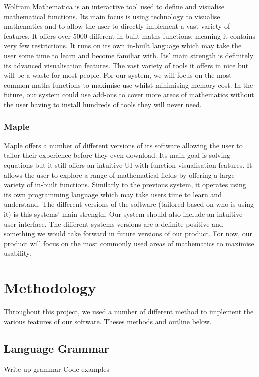\documentclass[a4paper, oneside, 11pt]{report}
\begin{document}
Wolfram Mathematica is an interactive tool used to define and visualise mathematical functions. Its main focus is using technology to visualise mathematics and to allow the user to directly implement a vast variety of features. It offers over 5000 different in-built maths functions, meaning it contains very few restrictions. It runs on its own in-built language which may take the user some time to learn and become familiar with. Its' main strength is definitely its advanced visualisation features.
The vast variety of tools it offers in nice but will be a waste for most people. For our system, we will focus on the most common maths functions to maximise use whilst minimising memory cost. In the future, our system could use add-ons to cover more areas of mathematics without the user having to install hundreds of tools they will never need.


\subsection{Maple\cite{Maple}}

Maple offers a number of different versions of its software allowing the user to tailor their experience before they even download. Its main goal is solving equations but it still offers an intuitive UI with function visualisation features. It allows the user to explore a range of mathematical fields by offering a large variety of in-built functions. Similarly to the previous system, it operates using its own programming language which may take users time to learn and understand. The different versions of the software (tailored based on who is using it) is this systems' main strength.
Our system should also include an intuitive user interface. The different systems versions are a definite positive and something we would take forward in future versions of our product. For now, our product will focus on the most commonly used areas of mathematics to maximise usability.


\chapter{Methodology}

Throughout this project, we used a number of different method to implement the various features of our software. Theses methods and outline below.

\section{Language Grammar}
Write up grammar
Code examples
\end{document}
